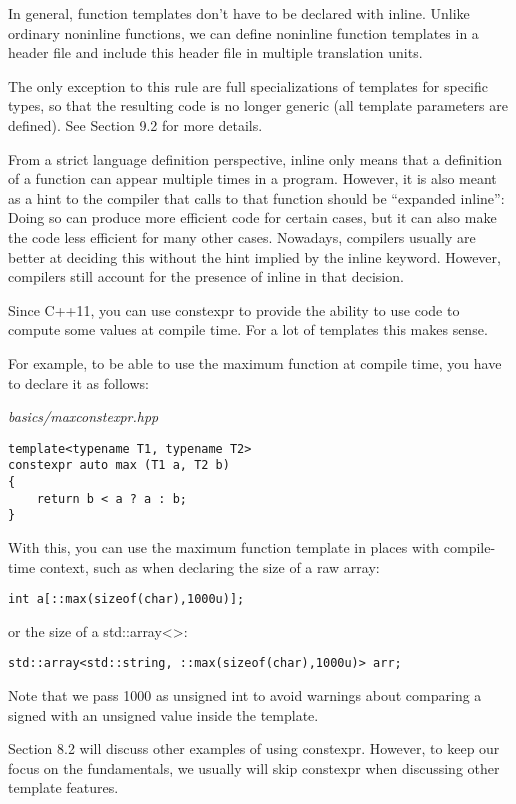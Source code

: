 In general, function templates don’t have to be declared with inline. Unlike ordinary noninline functions, we can define noninline function templates in a header file and include this header file in multiple translation units.

The only exception to this rule are full specializations of templates for specific types, so that the resulting code is no longer generic (all template parameters are defined). See Section 9.2 for more details.
 
From a strict language definition perspective, inline only means that a definition of a function can appear multiple times in a program. However, it is also meant as a hint to the compiler that calls to that function should be “expanded inline”: Doing so can produce more efficient code for certain cases, but it can also make the code less efficient for many other cases. Nowadays, compilers usually are better at deciding this without the hint implied by the inline keyword. However, compilers still account for the presence of inline in that decision.


Since C++11, you can use constexpr to provide the ability to use code to compute some values at compile time. For a lot of templates this makes sense.

For example, to be able to use the maximum function at compile time, you have to declare it as follows:

\noindent
\textit{basics/maxconstexpr.hpp}
\begin{lstlisting}[style=styleCXX]
template<typename T1, typename T2>
constexpr auto max (T1 a, T2 b)
{
	return b < a ? a : b;
}
\end{lstlisting}

With this, you can use the maximum function template in places with compile-time context, such as when declaring the size of a raw array:

\begin{lstlisting}[style=styleCXX]
int a[::max(sizeof(char),1000u)];
\end{lstlisting}

or the size of a std::array<>:

\begin{lstlisting}[style=styleCXX]
std::array<std::string, ::max(sizeof(char),1000u)> arr;
\end{lstlisting}

Note that we pass 1000 as unsigned int to avoid warnings about comparing a signed with an unsigned value inside the template.

Section 8.2 will discuss other examples of using constexpr. However, to keep our focus on the fundamentals, we usually will skip constexpr when discussing other template features.











